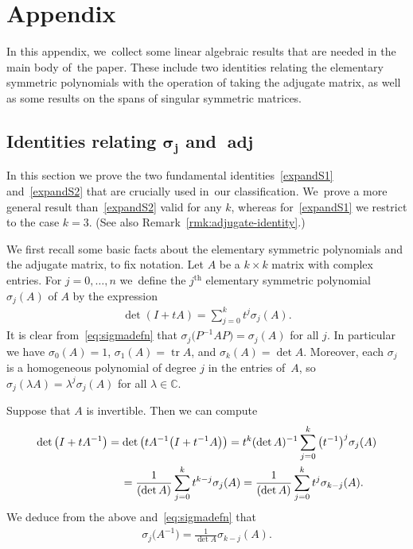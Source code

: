 \documentclass[pdftex]{sigma}
\def\C{\mathbb{C}}
\def\adj{\operatorname{adj}}
\def\tr{\operatorname{tr}}
\numberwithin{equation}{section}
\begin{document}
\section{Appendix}%

In this appendix, we~collect some linear algebraic results that are needed in the main body of~the paper. These include two identities relating the elementary symmetric polynomials with the operation of taking the adjugate matrix, as well as some results on the spans of singular symmetric matrices.

\subsection[Identities relating sigma j and adj]
{Identities relating $\boldsymbol{\sigma_j}$ and $\boldsymbol{\adj}$} \label{sec:sigma-adj}
In this section we prove the two fundamental identities~\eqref{expandS1} and~\eqref{expandS2} that are crucially used in~our classification. We~prove a more general result than~\eqref{expandS2} valid for any $k$, whereas for~\eqref{expandS1} we restrict to the case $k=3$. (See also Remark~\ref{rmk:adjugate-identity}.)

We first recall some basic facts about the elementary symmetric polynomials and the adjugate matrix, to fix notation. Let $A$ be a $k \times k$ matrix with complex entries. For $j=0, \dots, n$ we~define the $j^{\text{th}}$ elementary symmetric polynomial $\sigma_j(A)$ of $A$ by the expression
\begin{gather} \label{eq:sigmadefn}
\det (I + t A) = \sum_{j=0}^k t^j \sigma_j (A).
\end{gather}
It is clear from~\eqref{eq:sigmadefn} that $\sigma_j \big(P^{-1} A P\big) = \sigma_j (A)$ for all $j$. In particular we have $\sigma_0 (A) = 1$, $\sigma_1(A) = \tr A$, and $\sigma_k (A) = \det A$. Moreover, each $\sigma_j$ is a homogeneous polynomial of degree $j$ in the entries of~$A$, so $\sigma_j (\lambda A) = \lambda^j \sigma_j (A)$ for all $\lambda \in \C$.

Suppose that $A$ is invertible. Then we can compute
\begin{gather*}
\det\big(I + t A^{-1}\big) = \det \big(t A^{-1} \big(I + t^{-1} A\big) \big) = t^k (\det A)^{-1} \sum_{j=0}^k \big(t^{-1}\big)^j \sigma_j (A)
\\ \hphantom{\det\big(I + t A^{-1}\big)}
 {}= \frac{1}{(\det A)} \sum_{j=0}^k t^{k-j} \sigma_j (A) = \frac{1}{(\det A)} \sum_{j=0}^k t^j \sigma_{k-j}(A).
\end{gather*}
We deduce from the above and~\eqref{eq:sigmadefn} that
\begin{gather} \label{eq:sigmaAinverse}
\sigma_j \big(A^{-1}\big) = \frac{1}{\det A} \sigma_{k-j} (A).
\end{gather}
\end{document}
